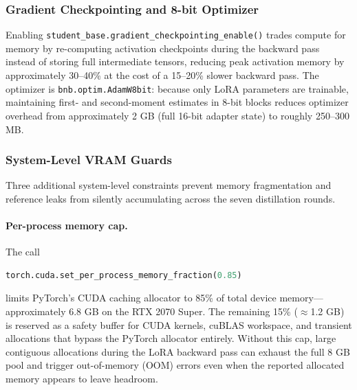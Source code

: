 \documentclass[11pt, a4paper]{article}
\begin{document}
\subsubsection{Gradient Checkpointing and 8-bit Optimizer}

Enabling \texttt{student\_base.gradient\_checkpointing\_enable()} trades compute for memory by re-computing activation checkpoints during the backward pass instead of storing full intermediate tensors, reducing peak activation memory by approximately 30--40\% at the cost of a 15--20\% slower backward pass. The optimizer is \texttt{bnb.optim.AdamW8bit}: because only LoRA parameters are trainable, maintaining first- and second-moment estimates in 8-bit blocks reduces optimizer overhead from approximately 2 GB (full 16-bit adapter state) to roughly 250--300 MB.

\subsubsection{System-Level VRAM Guards}

Three additional system-level constraints prevent memory fragmentation and reference leaks from silently accumulating across the seven distillation rounds.

\paragraph{Per-process memory cap.}
The call
\begin{lstlisting}[language=Python]
torch.cuda.set_per_process_memory_fraction(0.85)
\end{lstlisting}
limits PyTorch's CUDA caching allocator to 85\% of total device memory---approximately 6.8 GB on the RTX 2070 Super. The remaining 15\% (\(\approx\)1.2 GB) is reserved as a safety buffer for CUDA kernels, cuBLAS workspace, and transient allocations that bypass the PyTorch allocator entirely. Without this cap, large contiguous allocations during the LoRA backward pass can exhaust the full 8 GB pool and trigger out-of-memory (OOM) errors even when the reported allocated memory appears to leave headroom.
\end{document}
